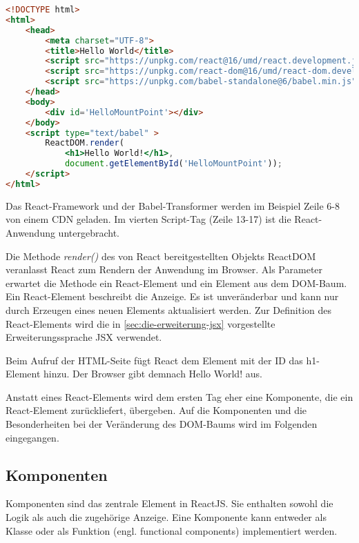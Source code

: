 \begin{lstlisting}[caption=Beispiel einer minimalen React-Anwendung , label=lst:ReactAnwendung, language=HTML]
<!DOCTYPE html>
<html>
	<head>
		<meta charset="UTF-8">
		<title>Hello World</title>
		<script src="https://unpkg.com/react@16/umd/react.development.js" crossorigin></script>
		<script src="https://unpkg.com/react-dom@16/umd/react-dom.development.js" crossorigin></script>
		<script src="https://unpkg.com/babel-standalone@6/babel.min.js"></script>
	</head>
	<body>
		<div id='HelloMountPoint'></div>
	</body>
	<script type="text/babel" >
		ReactDOM.render(
			<h1>Hello World!</h1>, 
			document.getElementById('HelloMountPoint'));
	</script>
</html>
\end{lstlisting}

Das React-Framework und der Babel-Transformer werden im Beispiel Zeile 6-8 von einem CDN geladen. Im vierten Script-Tag (Zeile 13-17) ist die React-Anwendung untergebracht. 

Die Methode \textit{render()} des von React bereitgestellten Objekts ReactDOM veranlasst React zum Rendern der Anwendung im Browser. Als Parameter erwartet die Methode ein React-Element und ein Element aus dem DOM-Baum. Ein React-Element beschreibt die Anzeige. Es ist unveränderbar und kann nur durch Erzeugen eines neuen Elements aktualisiert werden.  Zur Definition des React-Elements wird die in \autoref{sec:die-erweiterung-jsx} vorgestellte Erweiterungssprache JSX verwendet.

Beim Aufruf der HTML-Seite fügt React dem Element mit der ID \glqq {} das h1-Element hinzu. Der Browser gibt demnach \glqq Hello World!\grqq{} aus. \autocites[vgl.][4\psqq, 26\psqq]{Zeigermann.2016}[vgl.][]{Facebook.2018}[vgl.][]{Facebook.2018c}[vgl.][2\psqq]{Stefanov.2017}

Anstatt eines React-Elements wird dem ersten Tag eher eine Komponente, die ein React-Element zurückliefert, übergeben. Auf die Komponenten und die Besonderheiten bei der Veränderung des DOM-Baums wird im Folgenden eingegangen.

\subsection{Komponenten}
Komponenten sind das zentrale Element in ReactJS. Sie enthalten sowohl die Logik als auch die zugehörige Anzeige. Eine Komponente kann entweder als Klasse oder als Funktion (engl. functional components) implementiert werden.  %

